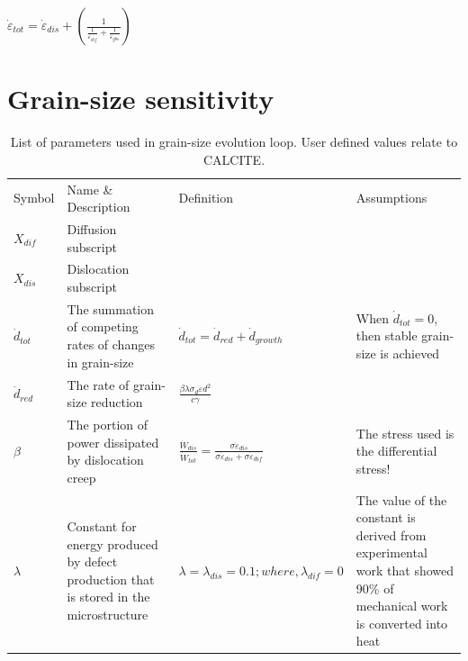 \documentclass[]{scrreprt}
\begin{document}
$\dot{\varepsilon}_{tot}=\dot{\varepsilon}_{dis}+\left(\frac{1}{\frac{1}{\dot{\varepsilon}_{dif}}+\frac{1}{\dot{\varepsilon}_{gbs}}}\right)$\\


\chapter{Grain-size sensitivity}
\label{chapter:size_sensitivity}

\begin{table}
\centering
\captionsetup{justification=centering, font=footnotesize}
  \caption[inline]{List of parameters used in grain-size evolution loop. User defined values relate to CALCITE.}
\label{tab:grain_evo_params}

\begin{tabular}{| L{1.3cm} | C{3.95cm} | C{5.25cm} | C{4.95cm} |}
\hline\noalign{\smallskip}
Symbol & Name \& Description & Definition & Assumptions \\
\noalign{\smallskip}\hline\noalign{\smallskip}

$X_{dif}$ & {\small Diffusion subscript} &  &  \\

$X_{dis}$ & {\small Dislocation subscript} &  &  \\

$\dot{d}_{tot}$ & {\small The summation of competing rates of changes in grain-size} & $\dot{d}_{tot} = \dot{d}_{red} + \dot{d}_{growth}$ & {\small When $\dot{d}_{tot} = 0$, then stable grain-size is achieved} \\

$\dot{d}_{red}$ & {\small The rate of grain-size reduction} & $\frac{\beta\lambda\sigma_{d}\dot{\varepsilon}d^2}{c\gamma}$ &  \\

$\beta$ & {\small The portion of power dissipated by dislocation creep} & $\frac{\dot{W}_{dis}}{\dot{W}_{tot}} = \frac{\sigma\dot{\varepsilon}_{dis}}{\sigma\dot{\varepsilon}_{dis} + \sigma\dot{\varepsilon}_{dif}}$ & {\small The stress used is the differential stress!} \\

$\lambda$ & {\small Constant for energy produced by defect production that is stored in the microstructure} & $\lambda=\lambda_{dis}= 0.1;  where,   \lambda_{dif} = 0$ & {\small The value of the constant is derived from experimental work that showed 90\% of mechanical work is converted into heat \citep{Austin2009}}\\


\end{tabular}
\end{table}
\end{document}
